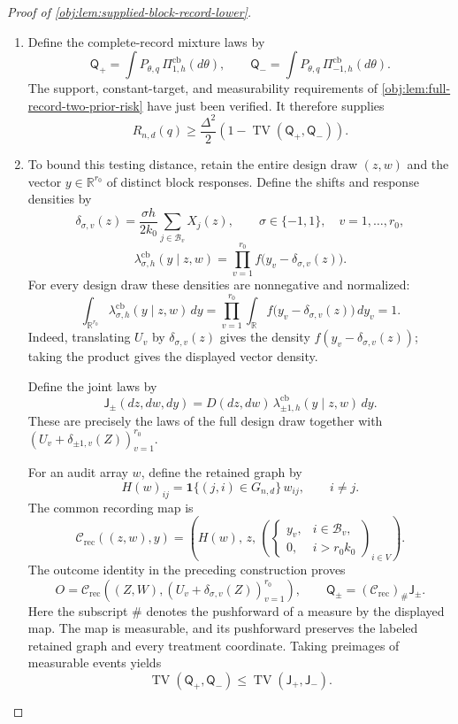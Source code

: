 \documentclass[11pt]{article}
\begin{document}
\begin{proof}[Proof of \cref{obj:lem:supplied-block-record-lower}]
\begin{enumerate}
\item Define the complete-record mixture laws by
\[
\mathsf Q_+
=
\int P_{\theta,q}\,\Pi^{\mathrm{cb}}_{1,h}(d\theta),
\qquad
\mathsf Q_-
=
\int P_{\theta,q}\,\Pi^{\mathrm{cb}}_{-1,h}(d\theta).
\]
The support, constant-target, and measurability requirements of
\cref{obj:lem:full-record-two-prior-risk} have just been verified. It therefore supplies
\[
R_{n,d}(q)
\ge
\frac{\Delta^2}{2}
\left(1-\operatorname{TV}(\mathsf Q_+,\mathsf Q_-)\right).
\]

\item To bound this testing distance, retain the entire design draw \((z,w)\) and the vector \(y\in\mathbb R^{r_0}\) of distinct block responses. Define the shifts and response densities by
\[
\delta_{\sigma,v}(z)
=
\frac{\sigma h}{2k_0}
\sum_{j\in\mathcal B_v}X_j(z),
\qquad
\sigma\in\{-1,1\},\quad v=1,\ldots,r_0,
\]
\[
\lambda^{\mathrm{cb}}_{\sigma,h}(y\mid z,w)
=
\prod_{v=1}^{r_0}f\bigl(y_v-\delta_{\sigma,v}(z)\bigr).
\]
For every design draw these densities are nonnegative and normalized:
\[
\int_{\mathbb R^{r_0}}
\lambda^{\mathrm{cb}}_{\sigma,h}(y\mid z,w)\,dy
=
\prod_{v=1}^{r_0}
\int_{\mathbb R}f\bigl(y_v-\delta_{\sigma,v}(z)\bigr)\,dy_v
=1.
\]
Indeed, translating \(U_v\) by \(\delta_{\sigma,v}(z)\) gives the density
\(f(y_v-\delta_{\sigma,v}(z))\); taking the product gives the displayed vector density.

Define the joint laws by
\[
\mathsf J_\pm(dz,dw,dy)
=
D(dz,dw)\,
\lambda^{\mathrm{cb}}_{\pm1,h}(y\mid z,w)\,dy.
\]
These are precisely the laws of the full design draw together with
\((U_v+\delta_{\pm1,v}(Z))_{v=1}^{r_0}\).

For an audit array \(w\), define the retained graph by
\[
H(w)_{ij}
=
\mathbf1\{(j,i)\in G_{n,d}\}\,w_{ij},
\qquad i\ne j.
\]
The common recording map is
\[
\mathcal C_{\mathrm{rec}}((z,w),y)
=
\left(
H(w),\,z,\,
\left(
\begin{cases}
y_v,&i\in\mathcal B_v,\\
0,&i>r_0k_0
\end{cases}
\right)_{i\in V}
\right).
\]
The outcome identity in the preceding construction proves
\[
O
=
\mathcal C_{\mathrm{rec}}
\left((Z,W),(U_v+\delta_{\sigma,v}(Z))_{v=1}^{r_0}\right),
\qquad
\mathsf Q_\pm=(\mathcal C_{\mathrm{rec}})_\#\mathsf J_\pm.
\]
Here the subscript \(\#\) denotes the pushforward of a measure by the displayed map. The map is measurable, and its pushforward preserves the labeled retained graph and every treatment coordinate. Taking preimages of measurable events yields
\[
\operatorname{TV}(\mathsf Q_+,\mathsf Q_-)
\le
\operatorname{TV}(\mathsf J_+,\mathsf J_-).
\]


\end{enumerate}
\end{proof}
\end{document}
